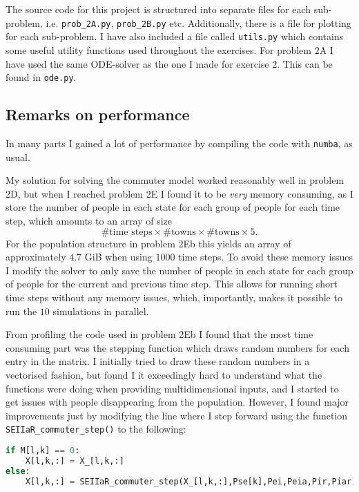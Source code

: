 The source code for this project is structured into separate files for each sub-problem, i.e. \lstinline|prob_2A.py|, \lstinline|prob_2B.py| etc. Additionally, there is a file for plotting for each sub-problem. I have also included a file called \lstinline|utils.py| which contains some useful utility functions used throughout the exercises. For problem $2$A I have used the same ODE-solver as the one I made for exercise $2$. This can be found in \lstinline|ode.py|.

\subsection{Remarks on performance}

In many parts I gained a lot of performance by compiling the code with \lstinline|numba|, as usual. 

My solution for solving the commuter model worked reasonably well in problem 2D, but when I reached problem 2E I found it to be \textit{very} memory consuming, as I store the number of people in each state for each group of people for each time step, which amounts to an array of size
$$
	\#\text{time steps}\times\#\text{towns} \times\#\text{towns} \times 5.
$$ 
For the population structure in problem 2Eb this yields an array of approximately $4.7$ GiB when using $1000$ time steps. To avoid these memory issues I modify the solver to only save the number of people in each state for each group of people for the current and previous time step. This allows for running short time steps without any memory issues, which, importantly,  makes it possible to run the $10$ simulations in parallel. 

From profiling the code used in problem 2Eb I found that the most time consuming part was the stepping function which draws random numbers for each entry in the matrix. I initially tried to draw these random numbers in a vectorised fashion, but found I it exceedingly hard to understand what the functions were doing when providing multidimensional inputs, and I started to get issues with people disappearing from the population. However, I found major improvements just by modifying the line where I step forward using the function \lstinline|SEIIaR_commuter_step()| to the following:
\begin{lstlisting}[language=Python]
if M[l,k] == 0:
    X[l,k,:] = X_[l,k,:]
else:
    X[l,k,:] = SEIIaR_commuter_step(X_[l,k,:],Pse[k],Pei,Peia,Pir,Piar)
\end{lstlisting} 

